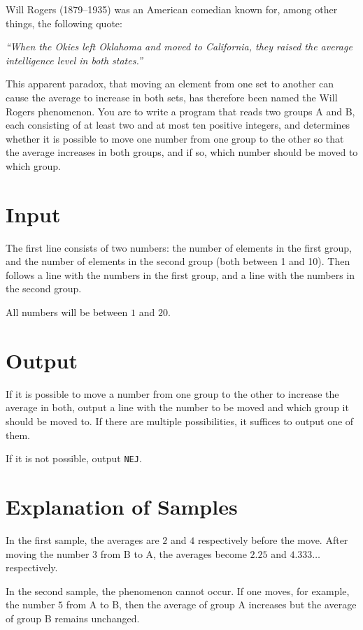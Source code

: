 Will Rogers (1879--1935) was an American comedian known for, among other things, the following quote:

\emph{``When the Okies left Oklahoma and moved to California, they raised the average intelligence level in both states.''}

This apparent paradox, that moving an element from one set to another can cause the average to increase in both sets, has therefore been named the Will Rogers phenomenon.
You are to write a program that reads two groups A and B, each consisting of at least two and at most ten positive integers, and determines whether it is possible to move one number from one group to the other so that the average increases in both groups, and if so, which number should be moved to which group.

\section*{Input}
The first line consists of two numbers: the number of elements in the first group, and the number of elements in the second group (both between 1 and 10).
Then follows a line with the numbers in the first group, and a line with the numbers in the second group.

All numbers will be between $1$ and $20$.

\section*{Output}
If it is possible to move a number from one group to the other to increase the average in both, output a line with the number to be moved and which group it should be moved to.
If there are multiple possibilities, it suffices to output one of them.

If it is not possible, output \texttt{NEJ}.

\section*{Explanation of Samples}
In the first sample, the averages are $2$ and $4$ respectively before the move.
After moving the number $3$ from B to A, the averages become $2.25$ and $4.333\ldots$ respectively.

In the second sample, the phenomenon cannot occur.
If one moves, for example, the number $5$ from A to B, then the average of group A increases but the average of group B remains unchanged.
